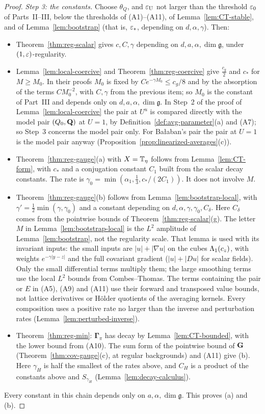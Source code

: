 \begin{proof}
\emph{Step 3: the constants.} Choose $\theta_Q$, and $\varepsilon_{\rm U}$ not larger than the threshold $\varepsilon_0$ of Parts~II--III, below the thresholds of (A1)--(A11), of Lemma~\ref{lem:CT-stable}, and of Lemma~\ref{lem:bootstrap} (that is, $\varepsilon_*$, depending on $d,\alpha,\gamma$). Then:
\begin{itemize}
\item Theorem~\ref{thm:reg-scalar} gives $c,C,\gamma$ depending on $d,a,\alpha,\dim\mathfrak g$, under $(1,\varepsilon)$-regularity.
\item Lemma~\ref{lem:local-coercive} and Theorem~\ref{thm:reg-coercive} give $\frac{c_g}2$ and $c_*$ for $M\ge M_0$. In their proofs $M_0$ is fixed by $Ce^{-\gamma M_0}\le c_g/8$ and by the absorption of the terms $CM_0^{-2}$, with $C,\gamma$ from the previous item; so $M_0$ is the constant of Part~III and depends only on $d,a,\alpha,\dim\mathfrak g$. In Step~2 of the proof of Lemma~\ref{lem:local-coercive} the pair at $U^u$ is compared directly with the model pair $(Q_0,\mathbf Q)$ at $U=1$, by Definition~\ref{def:avg-parameter}(a) and (A7); so Step~3 concerns the model pair only. For Ba\l aban's pair the pair at $U=1$ is the model pair anyway (Proposition~\ref{prop:linearized-averages}(c)).
\item Theorem~\ref{thm:reg-gauge}(a) with $X=\mathbb T_\eta$ follows from Lemma~\ref{lem:CT-form}, with $c_*$ and a conjugation constant $C_1$ built from the scalar decay constants. The rate is $\gamma_0=\min(\alpha_1,\frac13,c_*/(2C_1))$. It does not involve $M$.
\item Theorem~\ref{thm:reg-gauge}(b) follows from Lemma~\ref{lem:bootstrap-local}, with $\gamma'=\frac12\min(\gamma,\gamma_0)$ and a constant depending on $d,\alpha,\gamma,\gamma_0,C_\delta$. Here $C_\delta$ comes from the pointwise bounds of Theorem~\ref{thm:reg-scalar}(g). The letter $M$ in Lemma~\ref{lem:bootstrap-local} is the $L^2$ amplitude of Lemma~\ref{lem:bootstrap}, not the regularity scale. That lemma is used with its invariant inputs: the small inputs are $|u|+|\nabla u|$ on the cubes $\Lambda_1(c_z)$, with weights $e^{-\gamma|y-z|}$ and the full covariant gradient ($|u|+|Du|$ for scalar fields). Only the small differential terms multiply them; the large smoothing terms use the local $L^2$ bounds from Combes--Thomas. The terms containing the pair or $E$ in (A5), (A9) and (A11) use their forward and transposed value bounds, not lattice derivatives or H\"older quotients of the averaging kernels. Every composition uses a positive rate no larger than the inverse and perturbation rates (Lemma~\ref{lem:perturbed-inverse}).
\item Theorem~\ref{thm:reg-min}: $\boldsymbol\Gamma_\pi$ has decay by Lemma~\ref{lem:CT-bounded}, with the lower bound from (A10). The sum form of the pointwise bound of $\mathbf G$ (Theorem~\ref{thm:cov-gauge}(c), at regular backgrounds) and (A11) give (b). Here $\gamma_H$ is half the smallest of the rates above, and $C_H$ is a product of the constants above and $S_{\gamma_H}$ (Lemma~\ref{lem:decay-calculus}).
\end{itemize}
Every constant in this chain depends only on $a,\alpha,\dim\mathfrak g$. This proves (a) and (b).


\end{proof}
